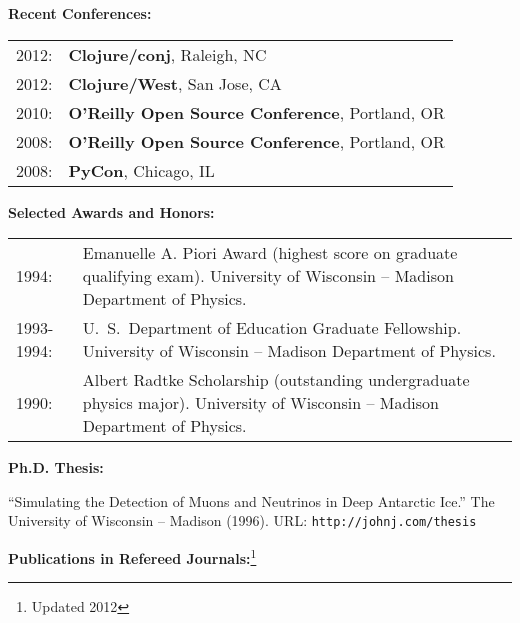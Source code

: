 {\bf Recent Conferences:}
\vspace{0.25cm}

\begin{tabular}[t]{lp{}}

2012: & {\bf Clojure/conj}, Raleigh, NC\\
2012: & {\bf Clojure/West}, San Jose, CA\\
2010: & {\bf O'Reilly Open Source Conference}, Portland, OR\\
2008: & {\bf O'Reilly Open Source Conference}, Portland, OR\\
2008: & {\bf PyCon}, Chicago, IL\\
\end{tabular}

\newpage

{\bf Selected Awards and Honors:}
\vspace{0.25cm}

\begin{tabular}[t]{lp{}}

1994: & Emanuelle A. Piori Award (highest score on graduate qualifying exam).
University of Wisconsin -- Madison Department of Physics.\\[0.25cm]

1993-1994: & U.~S.~Department of Education Graduate Fellowship.  
University of Wisconsin -- Madison Department of Physics.\\[0.25cm]

1990: & Albert Radtke Scholarship (outstanding undergraduate physics major).
University of Wisconsin -- Madison Department of Physics.\\[0.25cm]

\end{tabular}

{\bf Ph.D. Thesis:}

``Simulating the Detection of Muons and Neutrinos in Deep Antarctic Ice.'' The University of Wisconsin -- Madison (1996).  URL: {\tt http://johnj.com/thesis}
\vspace{0.25cm}

{\bf Publications in Refereed Journals:}\footnote{Updated 2012}

